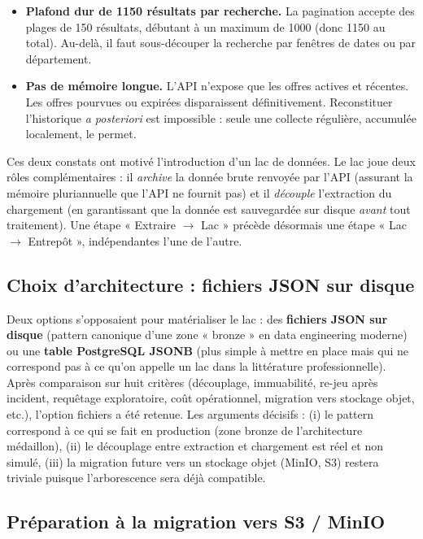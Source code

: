 \documentclass[12pt, a4paper]{article}
\begin{document}
\begin{itemize}
    \item \textbf{Plafond dur de 1150 résultats par recherche.} La pagination accepte des plages de 150 résultats, débutant à un maximum de 1000 (donc 1150 au total). Au-delà, il faut sous-découper la recherche par fenêtres de dates ou par département.
    \item \textbf{Pas de mémoire longue.} L'API n'expose que les offres actives et récentes. Les offres pourvues ou expirées disparaissent définitivement. Reconstituer l'historique \emph{a posteriori} est impossible : seule une collecte régulière, accumulée localement, le permet.
\end{itemize}

Ces deux constats ont motivé l'introduction d'un lac de données. Le lac joue deux rôles complémentaires : il \emph{archive} la donnée brute renvoyée par l'API (assurant la mémoire pluriannuelle que l'API ne fournit pas) et il \emph{découple} l'extraction du chargement (en garantissant que la donnée est sauvegardée sur disque \emph{avant} tout traitement). Une étape « Extraire $\rightarrow$ Lac » précède désormais une étape « Lac $\rightarrow$ Entrepôt », indépendantes l'une de l'autre.

\subsection{Choix d'architecture : fichiers JSON sur disque}

Deux options s'opposaient pour matérialiser le lac : des \textbf{fichiers JSON sur disque} (pattern canonique d'une zone « bronze » en data engineering moderne) ou une \textbf{table PostgreSQL JSONB} (plus simple à mettre en place mais qui ne correspond pas à ce qu'on appelle un lac dans la littérature professionnelle). Après comparaison sur huit critères (découplage, immuabilité, re-jeu après incident, requêtage exploratoire, coût opérationnel, migration vers stockage objet, etc.), l'option fichiers a été retenue. Les arguments décisifs : (i) le pattern correspond à ce qui se fait en production (zone bronze de l'architecture médaillon), (ii) le découplage entre extraction et chargement est réel et non simulé, (iii) la migration future vers un stockage objet (MinIO, S3) restera triviale puisque l'arborescence sera déjà compatible.

\subsection{Préparation à la migration vers S3 / MinIO}
\end{document}
